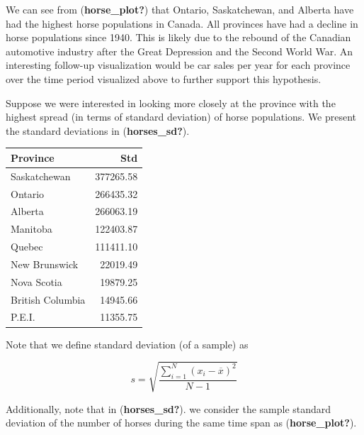 \documentclass[
  letterpaper,
  DIV=11,
  numbers=noendperiod]{scrartcl}
\begin{document}
We can see from (\textbf{horse\_plot?}) that Ontario, Saskatchewan, and
Alberta have had the highest horse populations in Canada. All provinces
have had a decline in horse populations since 1940. This is likely due
to the rebound of the Canadian automotive industry after the Great
Depression and the Second World War. An interesting follow-up
visualization would be car sales per year for each province over the
time period visualized above to further support this hypothesis.

Suppose we were interested in looking more closely at the province with
the highest spread (in terms of standard deviation) of horse
populations. We present the standard deviations in
(\textbf{horses\_sd?}).

\begin{longtable}[]{@{}lr@{}}
\toprule\noalign{}
Province & Std \\
\midrule\noalign{}
\endhead
\bottomrule\noalign{}
\endlastfoot
Saskatchewan & 377265.58 \\
Ontario & 266435.32 \\
Alberta & 266063.19 \\
Manitoba & 122403.87 \\
Quebec & 111411.10 \\
New Brunswick & 22019.49 \\
Nova Scotia & 19879.25 \\
British Columbia & 14945.66 \\
P.E.I. & 11355.75 \\
\end{longtable}

Note that we define standard deviation (of a sample) as

\[s = \sqrt{\frac{\sum_{i=1}^N (x_i - \overline{x})^2}{N-1} }\]

Additionally, note that in (\textbf{horses\_sd?}). we consider the
sample standard deviation of the number of horses during the same time
span as (\textbf{horse\_plot?}).
\end{document}

